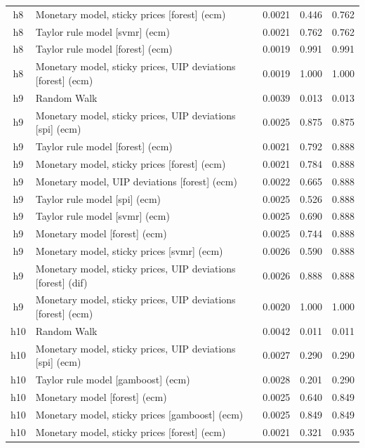 \begin{ThreePartTable}
\begin{longtable}[t]{cp{5.5cm}ccc}
h8 & \raggedright Monetary model, sticky prices [forest] (ecm) & 0.0021 & 0.446 & 0.762\\
h8 & \raggedright Taylor rule model [svmr] (ecm) & 0.0021 & 0.762 & 0.762\\
h8 & \raggedright Taylor rule model [forest] (ecm) & 0.0019 & 0.991 & 0.991\\
h8 & \raggedright Monetary model, sticky prices, UIP deviations [forest] (ecm) & 0.0019 & 1.000 & 1.000\\
\addlinespace
h9 & \raggedright Random Walk & 0.0039 & 0.013 & 0.013\\
h9 & \raggedright Monetary model, sticky prices, UIP deviations [spi] (ecm) & 0.0025 & 0.875 & 0.875\\
h9 & \raggedright Taylor rule model [forest] (ecm) & 0.0021 & 0.792 & 0.888\\
h9 & \raggedright Monetary model, sticky prices [forest] (ecm) & 0.0021 & 0.784 & 0.888\\
h9 & \raggedright Monetary model, UIP deviations [forest] (ecm) & 0.0022 & 0.665 & 0.888\\
h9 & \raggedright Taylor rule model [spi] (ecm) & 0.0025 & 0.526 & 0.888\\
h9 & \raggedright Taylor rule model [svmr] (ecm) & 0.0025 & 0.690 & 0.888\\
h9 & \raggedright Monetary model [forest] (ecm) & 0.0025 & 0.744 & 0.888\\
h9 & \raggedright Monetary model, sticky prices [svmr] (ecm) & 0.0026 & 0.590 & 0.888\\
h9 & \raggedright Monetary model, sticky prices, UIP deviations [forest] (dif) & 0.0026 & 0.888 & 0.888\\
h9 & \raggedright Monetary model, sticky prices, UIP deviations [forest] (ecm) & 0.0020 & 1.000 & 1.000\\
\addlinespace
h10 & \raggedright Random Walk & 0.0042 & 0.011 & 0.011\\
h10 & \raggedright Monetary model, sticky prices, UIP deviations [spi] (ecm) & 0.0027 & 0.290 & 0.290\\
h10 & \raggedright Taylor rule model [gamboost] (ecm) & 0.0028 & 0.201 & 0.290\\
h10 & \raggedright Monetary model [forest] (ecm) & 0.0025 & 0.640 & 0.849\\
h10 & \raggedright Monetary model, sticky prices [gamboost] (ecm) & 0.0025 & 0.849 & 0.849\\
h10 & \raggedright Monetary model, sticky prices [forest] (ecm) & 0.0021 & 0.321 & 0.935\\

\end{longtable}
\end{ThreePartTable}
